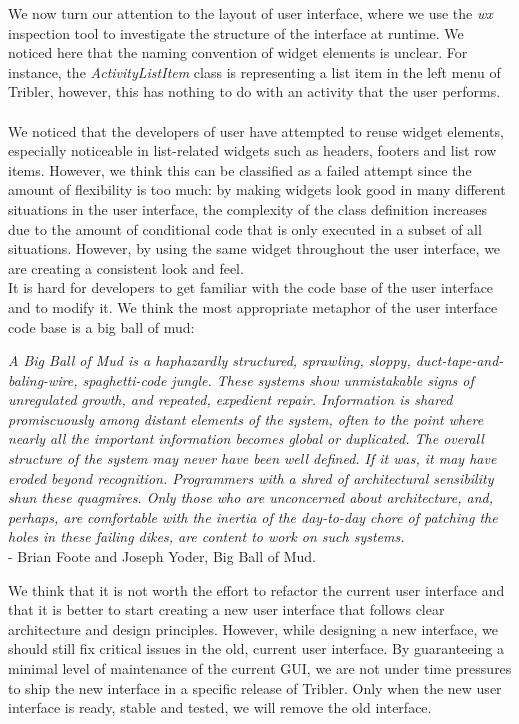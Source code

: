 We now turn our attention to the layout of user interface, where we use the \emph{wx} inspection tool to investigate the structure of the interface at runtime. We noticed here that the naming convention of widget elements is unclear. For instance, the \emph{ActivityListItem} class is representing a list item in the left menu of Tribler, however, this has nothing to do with an activity that the user performs.\\\\
We noticed that the developers of user have attempted to reuse widget elements, especially noticeable in list-related widgets such as headers, footers and list row items. However, we think this can be classified as a failed attempt since the amount of flexibility is too much: by making widgets look good in many different situations in the user interface, the complexity of the class definition increases due to the amount of conditional code that is only executed in a subset of all situations. However, by using the same widget throughout the user interface, we are creating a consistent look and feel.\\

It is hard for developers to get familiar with the code base of the user interface and to modify it. We think the most appropriate metaphor of the user interface code base is a big ball of mud:

\begin{displayquote}
	\emph{A Big Ball of Mud is a haphazardly structured, sprawling, sloppy, duct-tape-and-baling-wire, spaghetti-code jungle. These systems show unmistakable signs of unregulated growth, and repeated, expedient repair. Information is shared promiscuously among distant elements of the system, often to the point where nearly all the important information becomes global or duplicated. The overall structure of the system may never have been well defined. If it was, it may have eroded beyond recognition. Programmers with a shred of architectural sensibility shun these quagmires. Only those who are unconcerned about architecture, and, perhaps, are comfortable with the inertia of the day-to-day chore of patching the holes in these failing dikes, are content to work on such systems.}\\
	- Brian Foote and Joseph Yoder, Big Ball of Mud\cite{foote1997big}.
\end{displayquote}

We think that it is not worth the effort to refactor the current user interface and that it is better to start creating a new user interface that follows clear architecture and design principles. However, while designing a new interface, we should still fix critical issues in the old, current user interface. By guaranteeing a minimal level of maintenance of the current GUI, we are not under time pressures to ship the new interface in a specific release of Tribler. Only when the new user interface is ready, stable and tested, we will remove the old interface.


